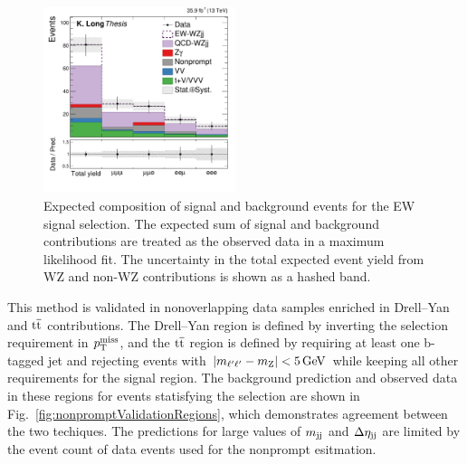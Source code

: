 \begin{figure}[htbp]
  \centering
   \includegraphics[width=0.5\textwidth]{figures/AnalysisProcedure/expectedYield_EWSignal.pdf}
  \caption{
    Expected composition of signal and background events for the EW signal selection.
    The expected sum of signal and background contributions are treated as the observed
    data in a maximum likelihood fit. The uncertainty in the total expected event yield
    from WZ and non-WZ contributions is shown as a hashed band.
        }
 \label{fig:expectedEWSignal}
\end{figure}

This method is validated in nonoverlapping data samples enriched in Drell--Yan and ${\mathrm{t}\overline{\mathrm{t}}}$ contributions.
The Drell--Yan region is defined by inverting the selection requirement in $p_{\mathrm{T}}^\text{miss}$, and
the ${\mathrm{t}\overline{\mathrm{t}}}$ region is defined by requiring at least one b-tagged jet and rejecting events with $|m_{\ell'\ell'} - m_{\mathrm{Z}}| < 5\,\text{Ge\hspace{-.08em}V}$
while keeping all other requirements for the signal region.
The background prediction and observed data in these regions for events statisfying the {\WZjj} selection are shown in
Fig.~\ref{fig:nonpromptValidationRegions}, which demonstrates agreement between the two techiques.
The predictions for large values of $m_{\mathrm{jj}}$ and
$\Delta\eta_{\mathrm{jj}}$ are limited by the event count of data events used for the nonprompt esitmation.

